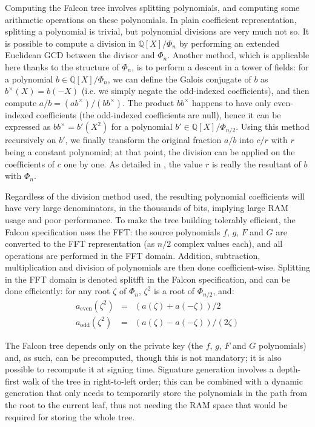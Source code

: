 \documentclass{llncs}
\newcommand{\bQ}{\mathbb{Q}}
\begin{document}
Computing the Falcon tree involves splitting polynomials, and computing
some arithmetic operations on these polynomials. In plain coefficient
representation, splitting a polynomial is trivial, but polynomial
divisions are very much not so. It is possible to compute a division in
$\bQ[X]/\Phi_n$ by performing an extended Euclidean GCD between the
divisor and $\Phi_n$. Another method, which is applicable here thanks to
the structure of $\Phi_n$, is to perform a descent in a tower of fields:
for a polynomial $b\in\bQ[X]/\Phi_n$, we can define the Galois conjugate
of $b$ as $b^\times(X) = b(-X)$ (i.e. we simply negate the odd-indexed
coefficients), and then compute $a/b = (ab^\times)/(bb^\times)$. The
product $bb^\times$ happens to have only even-indexed coefficients (the
odd-indexed coefficients are null), hence it can be expressed as
$bb^\times = b'(X^2)$ for a polynomial $b' \in\bQ[X]/\Phi_{n/2}$. Using
this method recursively on $b'$, we finally transform the original
fraction $a/b$ into $c/r$ with $r$ being a constant polynomial; at that
point, the division can be applied on the coefficients of $c$ one by
one. As detailed in \cite{PorPre2019}, the value $r$ is really the
resultant of $b$ with $\Phi_n$.

Regardless of the division method used, the resulting polynomial
coefficients will have very large denominators, in the thousands of
bits, implying large RAM usage and poor performance. To make the tree
building tolerably efficient, the Falcon specification uses the FFT: the
source polynomials $f$, $g$, $F$ and $G$ are converted to the FFT
representation (as $n/2$ complex values each), and all operations are
performed in the FFT domain. Addition, subtraction, multiplication and
division of polynomials are then done coefficient-wise. Splitting in
the FFT domain is denoted \textsf{splitfft} in the Falcon specification,
and can be done efficiently: for any root $\zeta$ of $\Phi_n$, $\zeta^2$
is a root of $\Phi_{n/2}$, and:
\begin{eqnarray*}
    a_{\text{even}}(\zeta^2) &=& (a(\zeta) + a(-\zeta))/2 \\
    a_{\text{odd}}(\zeta^2) &=& (a(\zeta) - a(-\zeta))/(2\zeta)
\end{eqnarray*}

The Falcon tree depends only on the private key (the $f$, $g$, $F$ and
$G$ polynomials) and, as such, can be precomputed, though this is not
mandatory; it is also possible to recompute it at signing time.
Signature generation involves a depth-first walk of the tree in
right-to-left order; this can be combined with a dynamic generation that
only needs to temporarily store the polynomials in the path from the
root to the current leaf, thus not needing the RAM space that would be
required for storing the whole tree.
\end{document}
